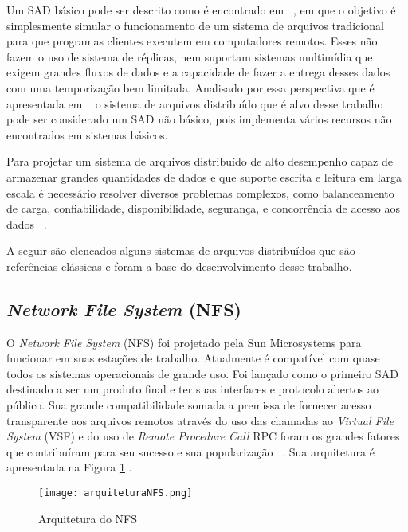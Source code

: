 	 Um SAD básico pode ser descrito como é encontrado em ~\cite{coulouris}, em que o objetivo é simplesmente simular o funcionamento de um sistema de arquivos tradicional para que programas clientes executem em computadores remotos. Esses não fazem o uso de sistema de réplicas, nem suportam sistemas multimídia que exigem grandes fluxos de dados e a capacidade de fazer a entrega desses dados com uma temporização bem limitada.
	 Analisado por essa perspectiva que é apresentada em ~\cite{coulouris} o sistema de arquivos distribuído que é alvo desse trabalho pode ser considerado um SAD não básico, pois implementa vários recursos não encontrados em sistemas básicos.
	 
	 Para projetar um sistema de arquivos distribuído de alto desempenho capaz de armazenar grandes quantidades de dados e que suporte escrita e leitura em larga escala é necessário resolver diversos problemas complexos, como balanceamento de carga, confiabilidade, disponibilidade, segurança, e concorrência de acesso aos dados ~\cite{coulouris}.
	 
	 
	 A seguir são elencados alguns sistemas de arquivos distribuídos que são referências clássicas e foram a base do desenvolvimento desse trabalho.
	
	 
	\subsection{\textit{Network File System} (NFS)}
	
	    O \textit{Network File System} (NFS) foi projetado pela Sun Microsystems para funcionar em suas estações de trabalho. Atualmente é compatível com quase todos os sistemas operacionais de grande uso. Foi lançado como o primeiro SAD destinado a ser um produto final e ter suas interfaces e protocolo abertos ao público. Sua grande compatibilidade somada a premissa de fornecer acesso transparente aos arquivos remotos através do uso das chamadas ao \textit{Virtual File System} (VSF) e do uso de \textit{Remote Procedure Call} RPC foram os grandes fatores que contribuíram para seu sucesso e sua popularização ~\cite{coulouris}. Sua arquitetura é apresentada na Figura \ref{fig:arquiteturaNFS} .
	
    	\begin{figure}[h]
            \texttt{[image: arquiteturaNFS.png]}
            \caption{Arquitetura do NFS ~\cite{coulouris}}
            \label{fig:arquiteturaNFS}
        \end{figure}
    
